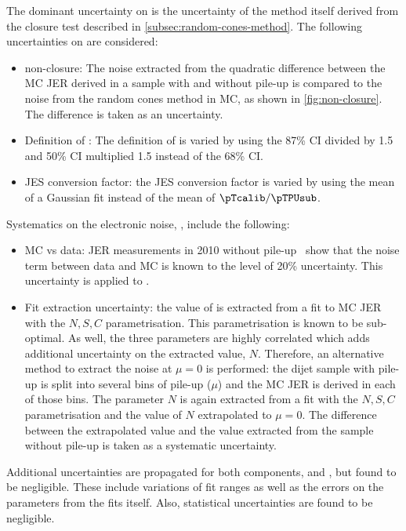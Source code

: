 The dominant uncertainty on \Npileup is the uncertainty of the method itself derived from the closure test described in \cref{subsec:random-cones-method}. The following uncertainties on \Npileup are considered:
\begin{itemize}
    \item \Npileup non-closure:
          The noise extracted from the quadratic difference between the MC JER derived in a sample with and without pile-up is compared to the noise from the random cones method in MC, as shown in \cref{fig:non-closure}. The difference is taken as an uncertainty.
    \item Definition of \sigmaRC:
          The definition of \sigmaRC is varied by using the 87\% CI divided by 1.5 and 50\% CI multiplied 1.5 instead of the 68\% CI.
    \item JES conversion factor: the JES conversion factor is varied by using the mean of a Gaussian fit instead of the mean of $\pTcalib / \pTPUsub$.
\end{itemize}

Systematics on the electronic noise, \Nmuzero, include the following:
\begin{itemize}
    \item MC vs data: JER measurements in 2010 without pile-up~\cite{PERF-2011-04} show that the noise term between data and MC is known to the level of 20\% uncertainty. This uncertainty is applied to \Nmuzero.
    \item Fit extraction uncertainty: the value of \Nmuzero is extracted from a fit to MC JER with the $N, S, C$ parametrisation. This parametrisation is known to be sub-optimal. As well, the three parameters are highly correlated which adds additional uncertainty on the extracted value, $N$. Therefore, an alternative method to extract the noise at $\mu=0$ is performed: the dijet sample with pile-up is split into several bins of pile-up ($\mu$) and the MC JER is derived in each of those bins. The parameter $N$ is again extracted from a fit with the $N, S, C$ parametrisation and the value of $N$ extrapolated to $\mu=0$. The difference between the extrapolated value and the value extracted from the sample without pile-up is taken as a systematic uncertainty.
\end{itemize}

Additional uncertainties are propagated for both components, \Npileup and \Nmuzero, but found to be negligible. These include variations of fit ranges as well as the errors on the parameters from the fits itself. Also, statistical uncertainties are found to be negligible. 

